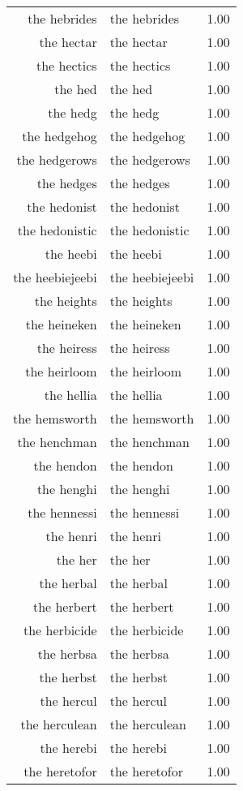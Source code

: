 \begin{table}[ht]
\begin{tabular}{rlr}
  the hebrides & the hebrides & 1.00 \\ 
  the hectar & the hectar & 1.00 \\ 
  the hectics & the hectics & 1.00 \\ 
  the hed & the hed & 1.00 \\ 
  the hedg & the hedg & 1.00 \\ 
  the hedgehog & the hedgehog & 1.00 \\ 
  the hedgerows & the hedgerows & 1.00 \\ 
  the hedges & the hedges & 1.00 \\ 
  the hedonist & the hedonist & 1.00 \\ 
  the hedonistic & the hedonistic & 1.00 \\ 
  the heebi & the heebi & 1.00 \\ 
  the heebiejeebi & the heebiejeebi & 1.00 \\ 
  the heights & the heights & 1.00 \\ 
  the heineken & the heineken & 1.00 \\ 
  the heiress & the heiress & 1.00 \\ 
  the heirloom & the heirloom & 1.00 \\ 
  the hellia & the hellia & 1.00 \\ 
  the hemsworth & the hemsworth & 1.00 \\ 
  the henchman & the henchman & 1.00 \\ 
  the hendon & the hendon & 1.00 \\ 
  the henghi & the henghi & 1.00 \\ 
  the hennessi & the hennessi & 1.00 \\ 
  the henri & the henri & 1.00 \\ 
  the her & the her & 1.00 \\ 
  the herbal & the herbal & 1.00 \\ 
  the herbert & the herbert & 1.00 \\ 
  the herbicide & the herbicide & 1.00 \\ 
  the herbsa & the herbsa & 1.00 \\ 
  the herbst & the herbst & 1.00 \\ 
  the hercul & the hercul & 1.00 \\ 
  the herculean & the herculean & 1.00 \\ 
  the herebi & the herebi & 1.00 \\ 
  the heretofor & the heretofor & 1.00 \\ 

\end{tabular}
\end{table}
